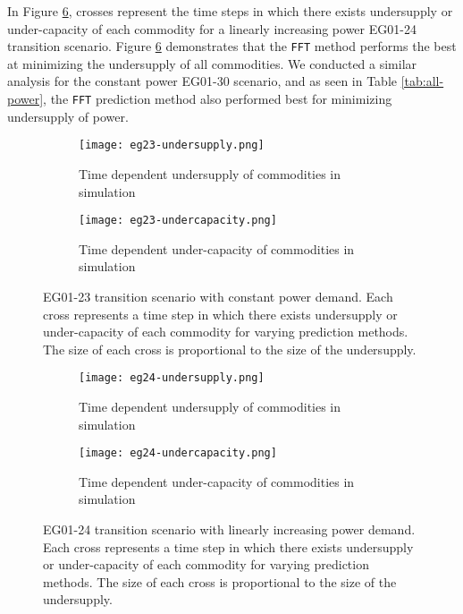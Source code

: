 In Figure \ref{fig:eg24under}, crosses represent the time steps in which 
there exists undersupply or under-capacity of each commodity for a linearly 
increasing power EG01-24 transition scenario.
Figure \ref{fig:eg24under} demonstrates that the \texttt{FFT} method 
performs the best at minimizing the undersupply of all commodities.
We conducted a similar analysis for the constant power EG01-30 scenario, and 
as seen in Table \ref{tab:all-power}, the \texttt{FFT} prediction method also performed 
best for minimizing undersupply of power. 

\begin{figure}[]
	\centering
	\begin{subfigure}[t]{1.2\textwidth}
		\centering
		\texttt{[image: eg23-undersupply.png]} 
		\caption{Time dependent undersupply of commodities in simulation }
		\label{fig:23undersupply}
	\end{subfigure}
	\vspace{1cm}
	\begin{subfigure}[t]{1.2\textwidth}
		\centering
		\texttt{[image: eg23-undercapacity.png]} 
		\caption{Time dependent under-capacity of commodities in simulation }
		\label{fig:23undercapacity}
	\end{subfigure}
	\hfill
	\caption{
	EG01-23 transition scenario with constant power demand. 
	Each cross represents a time step in which there exists undersupply 
	or under-capacity of each commodity for varying prediction methods. 
	The size of each cross is proportional to the size of the undersupply.}
	\label{fig:eg23under}
\end{figure}

\begin{figure}[]
	\centering
	\begin{subfigure}[t]{1.2\textwidth}
		\centering
		\texttt{[image: eg24-undersupply.png]} 
		\caption{Time dependent undersupply of commodities in simulation }
		\label{fig:24undersupply}
	\end{subfigure}
	\vspace{1cm}
	\begin{subfigure}[t]{1.2\textwidth}
		\centering
		\texttt{[image: eg24-undercapacity.png]} 
		\caption{Time dependent under-capacity of commodities in simulation }
		\label{fig:24undercapacity}
	\end{subfigure}
	\hfill
	\caption{
	EG01-24 transition scenario with linearly increasing power demand.
	Each cross represents a time step in which there exists undersupply 
	or under-capacity of each commodity for varying prediction methods. 
	The size of each cross is proportional to the size of the undersupply.}
	\label{fig:eg24under}
\end{figure}

